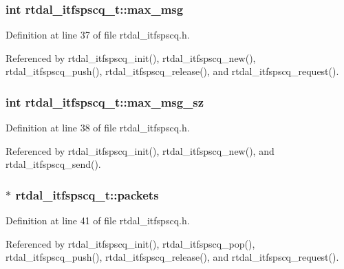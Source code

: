 \subsubsection[{max\-\_\-msg}]{\setlength{\rightskip}{0pt plus 5cm}int rtdal\-\_\-itfspscq\-\_\-t\-::max\-\_\-msg}\label{structrtdal__itfspscq__t_a9a7ca95050337e31cf161653e77501de}


Definition at line 37 of file rtdal\-\_\-itfspscq.\-h.



Referenced by rtdal\-\_\-itfspscq\-\_\-init(), rtdal\-\_\-itfspscq\-\_\-new(), rtdal\-\_\-itfspscq\-\_\-push(), rtdal\-\_\-itfspscq\-\_\-release(), and rtdal\-\_\-itfspscq\-\_\-request().

\subsubsection[{max\-\_\-msg\-\_\-sz}]{\setlength{\rightskip}{0pt plus 5cm}int rtdal\-\_\-itfspscq\-\_\-t\-::max\-\_\-msg\-\_\-sz}\label{structrtdal__itfspscq__t_a7b1b411ad0e83163ef0a2a2352a7ad1d}


Definition at line 38 of file rtdal\-\_\-itfspscq.\-h.



Referenced by rtdal\-\_\-itfspscq\-\_\-init(), rtdal\-\_\-itfspscq\-\_\-new(), and rtdal\-\_\-itfspscq\-\_\-send().

\subsubsection[{packets}]{$\ast$ rtdal\-\_\-itfspscq\-\_\-t\-::packets}\label{structrtdal__itfspscq__t_a08b1f24f2968b598c462a112a9bfd824}


Definition at line 41 of file rtdal\-\_\-itfspscq.\-h.



Referenced by rtdal\-\_\-itfspscq\-\_\-init(), rtdal\-\_\-itfspscq\-\_\-pop(), rtdal\-\_\-itfspscq\-\_\-push(), rtdal\-\_\-itfspscq\-\_\-release(), and rtdal\-\_\-itfspscq\-\_\-request().


